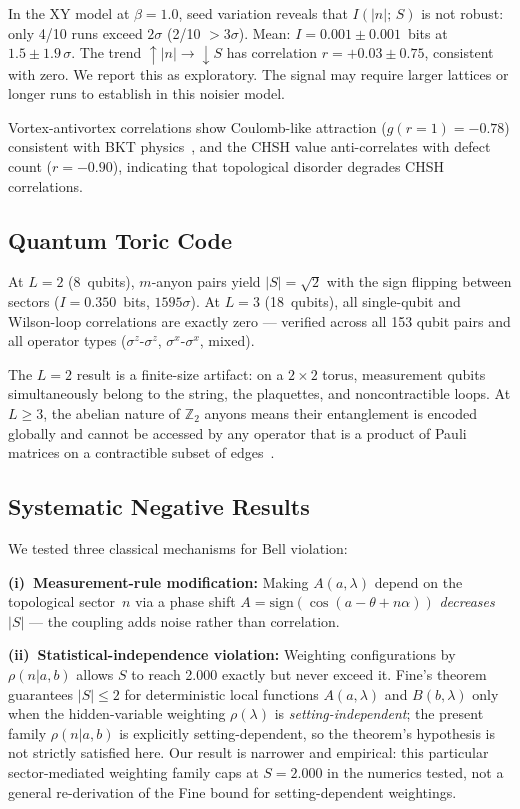 \documentclass[aps,pra,twocolumn,superscriptaddress,showpacs,floatfix]{revtex4-2}
\newcommand{\Ztwo}{\mathbb{Z}_2}
\begin{document}
In the XY model at $\beta = 1.0$, seed variation reveals that $I(|n|;\,S)$ is not
robust: only 4/10 runs exceed $2\sigma$ (2/10 ${>}3\sigma$). Mean:
$I = 0.001 \pm 0.001$~bits at $1.5 \pm 1.9\,\sigma$. The trend
$\uparrow|n| \to \downarrow S$ has correlation $r = +0.03 \pm 0.75$, consistent
with zero. We report this as exploratory. The signal may require larger lattices
or longer runs to establish in this noisier model.

Vortex-antivortex correlations show Coulomb-like attraction ($g(r{=}1) = -0.78$)
consistent with BKT physics~\cite{KT1973}, and the CHSH value anti-correlates
with defect count ($r = -0.90$), indicating that topological disorder degrades
CHSH correlations.

\subsection{Quantum Toric Code}

At $L = 2$ (8~qubits), $m$-anyon pairs yield $|S| = \sqrt{2}$ with the sign
flipping between sectors ($I = 0.350$~bits, $1595\sigma$). At $L = 3$
(18~qubits), all single-qubit and Wilson-loop correlations are exactly zero ---
verified across all 153 qubit pairs and all operator types
($\sigma^z$-$\sigma^z$, $\sigma^x$-$\sigma^x$, mixed).

The $L = 2$ result is a finite-size artifact: on a $2 \times 2$ torus,
measurement qubits simultaneously belong to the string, the plaquettes, and
noncontractible loops. At $L \geq 3$, the abelian nature of $\Ztwo$ anyons means
their entanglement is encoded globally and cannot be accessed by any operator that
is a product of Pauli matrices on a contractible subset of edges~\cite{Wen2002,Nayak2008}.

\subsection{Systematic Negative Results}

We tested three classical mechanisms for Bell violation:

\textbf{(i)~Measurement-rule modification:} Making $A(a, \lambda)$ depend on the
topological sector~$n$ via a phase shift
$A = \mathrm{sign}(\cos(a - \theta + n\alpha))$ \emph{decreases} $|S|$ --- the
coupling adds noise rather than correlation.

\textbf{(ii)~Statistical-independence violation:} Weighting configurations by
$\rho(n|a,b)$ allows $S$ to reach 2.000 exactly but never exceed it. Fine's theorem~\cite{Fine1982}
guarantees $|S| \leq 2$ for deterministic local functions $A(a, \lambda)$ and
$B(b, \lambda)$ only when the hidden-variable weighting $\rho(\lambda)$ is
\emph{setting-independent}; the present family $\rho(n|a,b)$ is explicitly
setting-dependent, so the theorem's hypothesis is not strictly satisfied here. Our
result is narrower and empirical: this particular sector-mediated weighting family
caps at $S=2.000$ in the numerics tested, not a general re-derivation of the Fine
bound for setting-dependent weightings.
\end{document}
